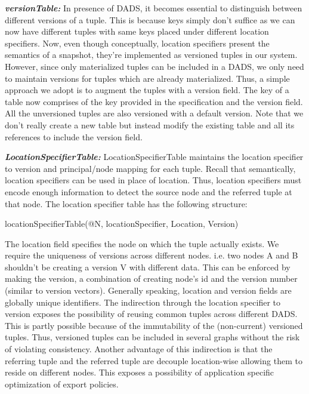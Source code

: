 \noindent\textit{\textbf{versionTable:}} In presence of DADS, it becomes essential to distinguish between different versions of a tuple. This is because keys simply don't suffice as we can now have different tuples with same keys placed under different location specifiers. Now, even though conceptually, location specifiers present the semantics of a snapshot, they're implemented as versioned tuples in our system. However, since only materialized tuples can be included in a DADS, we only need to maintain versions for tuples which are already materialized. Thus, a simple approach we adopt is to augment the tuples with a version field. The key of a table now comprises of the key provided in the specification and the version field. All the unversioned tuples are also versioned with a default version. Note that we don't really create a new table but instead modify the existing table and all its references to include the version field. 

\noindent\textit{\textbf{LocationSpecifierTable:}} LocationSpecifierTable maintains the location specifier to version and principal/node mapping for each tuple. Recall that semantically, location specifiers can be used in place of location. Thus, location specifiers must encode enough information to detect the source node and the referred tuple at that node. The location specifier table has the following structure:

\begin{center}
locationSpecifierTable(@N, locationSpecifier, Location, Version)
\end{center}

The location field specifies the node on which the tuple actually exists. We require the uniqueness of versions across different nodes. i.e. two nodes A and B shouldn't be creating a version V with different data. This can be enforced by making the version, a combination of creating node's id and the version number (similar to version vectors). Generally speaking, location and version fields are globally unique identifiers. The indirection through the location specifier to version exposes the possibility of reusing common tuples across different DADS. This is partly possible because of the immutability of the (non-current) versioned tuples. Thus, versioned tuples can be included in several graphs without the risk of violating consistency. Another advantage of this indirection is that the referring tuple and the referred tuple are decouple location-wise allowing them to reside on different nodes. This exposes a possibility of application specific optimization of export policies. 

